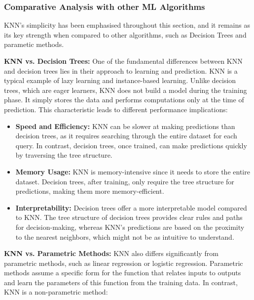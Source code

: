 \documentclass[letterpaper,10pt]{article}
\begin{document}
\subsubsection{Comparative Analysis with other ML Algorithms}
KNN's simplicity has been emphasised throughout this section, and it remains as its key strength when compared to other algorithms, such as Decision Trees and parametic methods. \par

\textbf{KNN vs. Decision Trees:} One of the fundamental differences between KNN and decision trees lies in their approach to learning and prediction. KNN is a typical example of lazy learning and instance-based learning. Unlike decision trees, which are eager learners, KNN does not build a model during the training phase. It simply stores the data and performs computations only at the time of prediction. This characteristic leads to different performance implications:

\begin{itemize}
    \item \textbf{Speed and Efficiency:} KNN can be slower at making predictions than decision trees, as it requires searching through the entire dataset for each query. In contrast, decision trees, once trained, can make predictions quickly by traversing the tree structure.
    \item \textbf{Memory Usage:} KNN is memory-intensive since it needs to store the entire dataset. Decision trees, after training, only require the tree structure for predictions, making them more memory-efficient.
    \item \textbf{Interpretability:} Decision trees offer a more interpretable model compared to KNN. The tree structure of decision trees provides clear rules and paths for decision-making, whereas KNN's predictions are based on the proximity to the nearest neighbors, which might not be as intuitive to understand.
\end{itemize}

\textbf{KNN vs. Parametric Methods:} KNN also differs significantly from parametric methods, such as linear regression or logistic regression. Parametric methods assume a specific form for the function that relates inputs to outputs and learn the parameters of this function from the training data. In contrast, KNN is a non-parametric method:
\end{document}
